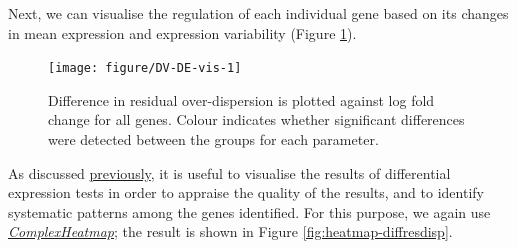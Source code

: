 \documentclass[9pt,a4paper,]{extarticle}
\newenvironment{Shaded}{\begin{snugshade}}{\end{snugshade}}
\newcommand{\DataTypeTok}[1]{\textcolor[rgb]{0.13,0.29,0.53}{#1}}
\newcommand{\DecValTok}[1]{\textcolor[rgb]{0.00,0.00,0.81}{#1}}
\newcommand{\FloatTok}[1]{\textcolor[rgb]{0.00,0.00,0.81}{#1}}
\newcommand{\KeywordTok}[1]{\textcolor[rgb]{0.13,0.29,0.53}{\textbf{#1}}}
\newcommand{\NormalTok}[1]{#1}
\newcommand{\OperatorTok}[1]{\textcolor[rgb]{0.81,0.36,0.00}{\textbf{#1}}}
\newcommand{\StringTok}[1]{\textcolor[rgb]{0.31,0.60,0.02}{#1}}
\begin{document}
Next, we can visualise the regulation of each individual gene based on its
changes in mean expression and expression variability
(Figure \ref{fig:DV-DE-vis}).

\begin{Shaded}
\end{Shaded}

\begin{figure}

{\centering \texttt{[image: figure/DV-DE-vis-1]} 

}

\caption{Difference in residual over-dispersion is plotted against log fold change for all genes. Colour indicates whether significant differences were detected between the groups for each parameter.}\label{fig:DV-DE-vis}
\end{figure}

As discussed \protect\hyperlink{vis-diff-exp}{previously}, it is useful to visualise the results
of differential expression tests in order to appraise the quality of the
results, and to identify systematic patterns among the genes identified.
For this purpose, we again use \emph{\href{https://bioconductor.org/packages/3.11/ComplexHeatmap}{ComplexHeatmap}}; the result is
shown in Figure \ref{fig:heatmap-diffresdisp}.
\end{document}
